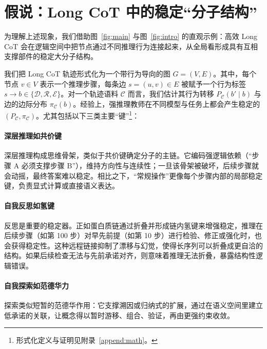 \section{假说：Long CoT 中的稳定“分子结构”}

为理解上述现象，我们借助图~\ref{fig:main} 与图~\ref{fig:intro} 的直观示例：高效 Long CoT 会在逻辑空间中把节点通过不同推理行为连接起来，从全局看形成具有互相支撑部件的稳定大分子结构。

我们把 Long CoT 轨迹形式化为一个带行为导向的图 \(G = (V, E)\)。其中，每个节点 \(v \in V\) 表示一个推理步骤，每条边 \(s = (u, v) \in E\) 被赋予一个行为标签 \(s \rightarrow b \in \{\mathcal{D}, \mathcal{R}, \mathcal{E}\}\)。对一个轨迹语料 \(\mathcal{C}\) 而言，我们估计其行为转移 \(P_{\mathcal{C}}(b' \mid b)\) 与边的边际分布 \(\pi_{\mathcal{C}}(b)\)。经验上，强推理教师在不同模型与任务上都会产生稳定的 \((P_{\mathcal{C}}, \pi_{\mathcal{C}})\)。尤其包括以下三类主要“键”\footnote{形式化定义与证明见附录~\ref{append:math}。}：\vspace{-8pt}







\paragraph{\textbf{深层推理如共价键}}
深层推理构成思维骨架，类似于共价键确定分子的主链。它编码强逻辑依赖（“步骤 A 必须支撑步骤 B”），维持方向性与连续性；一旦该骨架被破坏，后续步骤就会动摇，最终答案难以稳定。相比之下，“常规操作”更像每个步骤内部的局部稳定键，负责显式计算或直接语义表达。\vspace{-8pt}

\paragraph{\textbf{自我反思如氢键}}
反思是重要的稳定器。正如蛋白质链通过折叠并形成链内氢键来增强稳定，推理在后续步骤（如第 100 步）对早先前提（如第 10 步）进行检验、修正或强化时，也会获得稳定性。这种远程链接抑制了漂移与幻觉，使得长序列可以折叠成更自洽的结构。如果后续检查无法与先前承诺对齐，则意味着推理无法折叠，暴露结构性逻辑错误。

\paragraph{\textbf{自我探索如范德华力}}
探索类似短暂的范德华作用：它支撑溯因或归纳式的扩展，通过在语义空间里建立低承诺的关联，让概念得以暂时游移、组合、验证，再由更强约束收敛。
